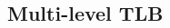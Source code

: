 \documentclass[8pt,a4paper,landscape]{extarticle}
\begin{document}
\pagestyle{empty}

\begin{multicols*}{3}
% 
% 
% 

\columnbreak

\section*{Multi-level TLB}
\end{multicols*}
\end{document}
